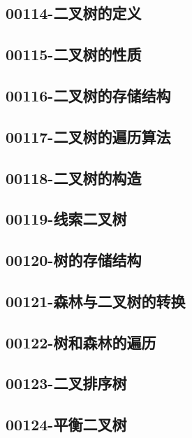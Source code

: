 \subsection{00114-二叉树的定义}

\subsection{00115-二叉树的性质}

\subsection{00116-二叉树的存储结构}

\subsection{00117-二叉树的遍历算法}

\subsection{00118-二叉树的构造}

\subsection{00119-线索二叉树}

\subsection{00120-树的存储结构}

\subsection{00121-森林与二叉树的转换}

\subsection{00122-树和森林的遍历}

\subsection{00123-二叉排序树}

\subsection{00124-平衡二叉树}

